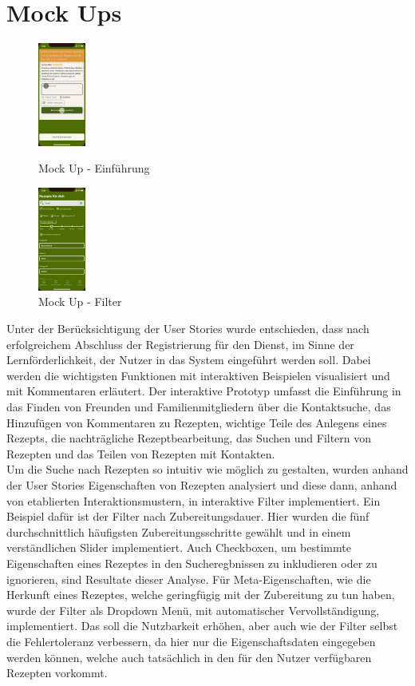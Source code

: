 \section{Mock Ups}
\begin{figure}
    \centering
        \includegraphics[width=0.14\textwidth]{images/introduction.jpg}
    \caption[Mock Up - Einführung]{Mock Up - Einführung}
\label{fig:mockup-introduction}
    \center
        \includegraphics[width=0.14\textwidth]{images/filter.jpg}
    \caption[Mock Up - Filter]{Mock Up - Filter}
\label{fig:mockup-filter}
\end{figure}
Unter der Berücksichtigung der User Stories wurde entschieden, dass nach erfolgreichem Abschluss der Registrierung für den Dienst, im Sinne der Lernförderlichkeit, der Nutzer in das System eingeführt werden soll. Dabei werden die wichtigsten Funktionen mit interaktiven Beispielen visualisiert und mit Kommentaren erläutert. Der interaktive Prototyp umfasst die Einführung in das Finden von Freunden und Familienmitgliedern über die Kontaktsuche, das Hinzufügen von Kommentaren zu Rezepten, wichtige Teile des Anlegens eines Rezepts, die nachträgliche Rezeptbearbeitung, das Suchen und Filtern von Rezepten und das Teilen von Rezepten mit Kontakten. \\

Um die Suche nach Rezepten so intuitiv wie möglich zu gestalten, wurden anhand der User Stories Eigenschaften von Rezepten analysiert und diese dann, anhand von etablierten Interaktionsmustern, in interaktive Filter implementiert. Ein Beispiel dafür ist der Filter nach Zubereitungsdauer. Hier wurden die fünf durchschnittlich häufigsten Zubereitungsschritte gewählt und in einem verständlichen Slider implementiert. Auch Checkboxen, um bestimmte Eigenschaften eines Rezeptes in den Sucheregbnissen zu inkludieren oder zu ignorieren, sind Resultate dieser Analyse. Für Meta-Eigenschaften, wie die Herkunft eines Rezeptes, welche geringfügig mit der Zubereitung zu tun haben, wurde der Filter als Dropdown Menü, mit automatischer Vervollständigung, implementiert. Das soll die Nutzbarkeit erhöhen, aber auch wie der Filter selbst die Fehlertoleranz verbessern, da hier nur die Eigenschaftsdaten eingegeben werden können, welche auch tatsächlich in den für den Nutzer verfügbaren Rezepten vorkommt. \\

